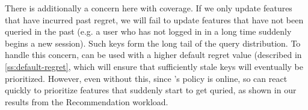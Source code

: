 There is additionally a concern here with coverage. If we only update features that have incurred past regret, we will fail to update features that have not been queried in the past (e.g. a user who has not logged in in a long time suddenly begins a new session). Such keys form the long tail of the query distribution. To handle this concern, \system{} can be used with a higher default regret value (described in \cref{ss:default-regret}, which will ensure that sufficiently stale keys will eventually be prioritized. However, even without this, since \system{}'s policy is online, so can react quickly to prioritize features that suddenly start to get quried, as shown in our results from the Recommendation workload.


















